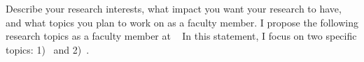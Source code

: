 \noindent%
{Describe your research interests,
what impact you want your
research to have,
and what topics you plan
to work on as a faculty member.}%
{%
I propose the following 
research topics 
as a faculty member
at %
}
{~%
In this statement,
I focus on 
two specific topics:}
1)~ and
2)~.~%